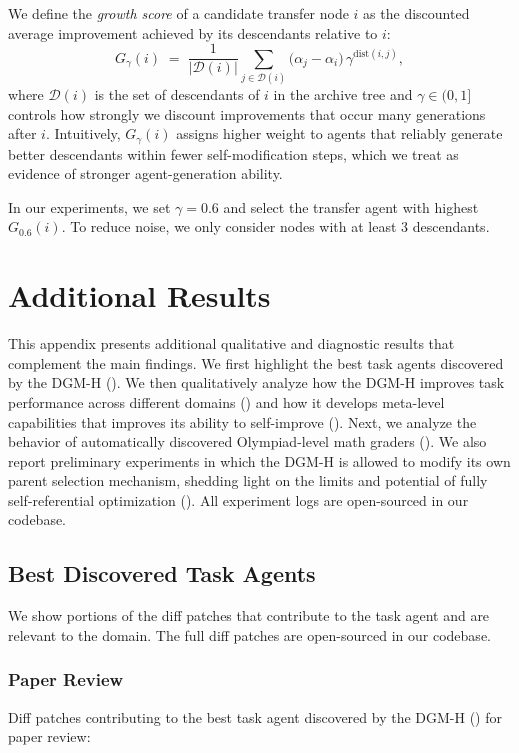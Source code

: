 \documentclass{article}
\begin{document}
We define the \emph{growth score} of a candidate transfer node \(i\) as the discounted average improvement achieved by its descendants relative to \(i\):
\[
G_\gamma(i)
\;=\;
\frac{1}{|\mathcal{D}(i)|}
\sum_{j \in \mathcal{D}(i)}
\bigl(\alpha_j - \alpha_i\bigr)\,\gamma^{\mathrm{dist}(i,j)},
\]
where \(\mathcal{D}(i)\) is the set of descendants of \(i\) in the archive tree and \(\gamma \in (0,1]\) controls how strongly we discount improvements that occur many generations after \(i\).
Intuitively, \(G_\gamma(i)\) assigns higher weight to agents that reliably generate better descendants within fewer self-modification steps, which we treat as evidence of stronger agent-generation ability.

In our experiments, we set \(\gamma = 0.6\) and select the transfer agent with highest \(G_{0.6}(i)\). To reduce noise, we only consider nodes with at least 3 descendants.

\section{Additional Results}
\label{app:res}

This appendix presents additional qualitative and diagnostic results that complement the main findings. We first highlight the best task agents discovered by the DGM-H (). We then qualitatively analyze how the DGM-H improves task performance across different domains () and how it develops meta-level capabilities that improves its ability to self-improve (). Next, we analyze the behavior of automatically discovered Olympiad-level math graders (). We also report preliminary experiments in which the DGM-H is allowed to modify its own parent selection mechanism, shedding light on the limits and potential of fully self-referential optimization (). All experiment logs are open-sourced in our codebase.

\subsection{Best Discovered Task Agents}
\label{app:best-agents}

We show portions of the diff patches that contribute to the task agent and are relevant to the domain. The full diff patches are open-sourced in our codebase.

\subsubsection{Paper Review}
\label{app:best-agents-paperreview}
Diff patches contributing to the best task agent discovered by the DGM-H () for paper review:

\end{document}
